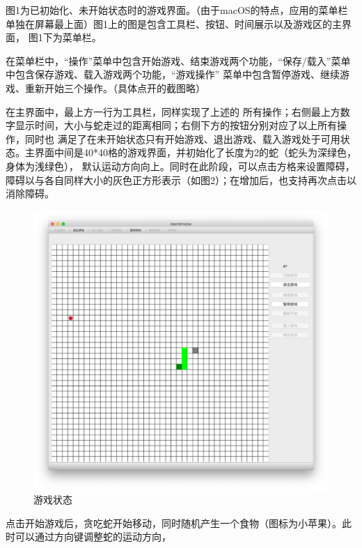 \documentclass[utf-8]{ctexart}
\begin{document}
    \par 图1为已初始化、未开始状态时的游戏界面。（由于macOS的特点，应用的菜单栏单独在屏幕最上面）图1上的图是包含工具栏、按钮、时间展示以及游戏区的主界面，
    图1下为菜单栏。\par 在菜单栏中，“操作”菜单中包含开始游戏、结束游戏两个功能，“保存/载入”菜单中包含保存游戏、载入游戏两个功能，“游戏操作”
    菜单中包含暂停游戏、继续游戏、重新开始三个操作。（具体点开的截图略）\par 在主界面中，最上方一行为工具栏，同样实现了上述的
    所有操作；右侧最上方数字显示时间，大小与蛇走过的距离相同；右侧下方的按钮分别对应了以上所有操作，同时也
    满足了在未开始状态只有开始游戏、退出游戏、载入游戏处于可用状态。主界面中间是40*40格的游戏界面，并初始化了长度为2的蛇（蛇头为深绿色，身体为浅绿色），
    默认运动方向向上。同时在此阶段，可以点击方格来设置障碍，障碍以与各自同样大小的灰色正方形表示（如图2）；在增加后，也支持再次点击以消除障碍。

    \begin{figure}[ht]
        \centering
        \includegraphics[scale = 0.3]{texsrc/开始游戏.png}
        \caption{游戏状态}
        \label{gaming}
    \end{figure}
    \par 点击开始游戏后，贪吃蛇开始移动，同时随机产生一个食物（图标为小苹果）。此时可以通过方向键调整蛇的运动方向，
\end{document}
